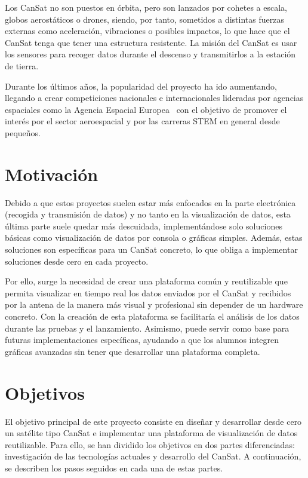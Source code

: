 Los CanSat no son puestos en órbita, pero son lanzados por cohetes a escala, globos aerostáticos o drones,
siendo, por tanto, sometidos a distintas fuerzas externas como aceleración, vibraciones o posibles impactos, lo que hace que el CanSat tenga que tener una estructura resistente.
La misión del CanSat es usar los sensores para recoger datos durante el descenso y transmitirlos a la estación de tierra.

Durante los últimos años, la popularidad del proyecto ha ido aumentando, llegando a crear competiciones nacionales e internacionales lideradas por agencias espaciales como la Agencia Espacial Europea~\cite{esa_cansat2024}
con el objetivo de promover el interés por el sector aeroespacial y por las carreras STEM en general desde pequeños.


\section{Motivación}
Debido a que estos proyectos suelen estar más enfocados en la parte electrónica (recogida y transmisión de datos) y no tanto en la visualización de datos,
esta última parte suele quedar más descuidada, implementándose solo soluciones básicas como visualización de datos por consola o gráficas simples.
Además, estas soluciones son específicas para un CanSat concreto, lo que obliga a implementar soluciones desde cero en cada proyecto.

Por ello, surge la necesidad de crear una plataforma común y reutilizable que permita visualizar en tiempo real los datos enviados por el CanSat y recibidos por la antena de la manera más visual y profesional sin depender de un hardware concreto.
Con la creación de esta plataforma se facilitaría el análisis de los datos durante las pruebas y el lanzamiento.
Asimismo, puede servir como base para futuras implementaciones específicas, ayudando a que los alumnos integren gráficas avanzadas sin tener que desarrollar una plataforma completa.


\section{Objetivos}
El objetivo principal de este proyecto consiste en diseñar y desarrollar desde cero un satélite tipo CanSat e implementar una plataforma de visualización de datos reutilizable.
Para ello, se han dividido los objetivos en dos partes diferenciadas: investigación de las tecnologías actuales y desarrollo del CanSat.
A continuación, se describen los pasos seguidos en cada una de estas partes.

